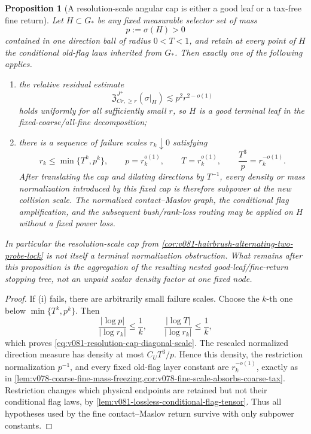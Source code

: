 \documentclass[10pt]{article}
\newtheorem{proposition}[theorem]{Proposition}
\begin{document}
\begin{proposition}[A resolution-scale angular cap is either a good leaf or a tax-free fine return]
\label{prop:v081-resolution-cap-freeze-or-return}
Let \(H\subset G_*\) be any fixed measurable selector set of mass
\[
p:=\sigma(H)>0
\]
contained in one direction ball of radius \(0<T<1\), and retain at every point of \(H\) the
conditional old-flag laws inherited from \(G_*\).  Then exactly one of the following applies.
\begin{enumerate}[label=\textnormal{(\roman*)}]
\item the relative residual estimate
\[
\mathfrak Z_{Cr,\ge r}^{J^+}(\sigma|_H)
\lesssim
p^2r^{2-o(1)}
\]
holds uniformly for all sufficiently small \(r\), so \(H\) is a good terminal leaf in the
fixed-coarse/all-fine decomposition;
\item there is a sequence of failure scales \(r_k\downarrow0\) satisfying
\begin{equation}
\label{eq:v081-resolution-cap-diagonal-scale}
\boxed{
r_k\le\min\{T^k,p^k\},
\qquad
p=r_k^{o(1)},
\qquad
T=r_k^{o(1)},
\qquad
\frac{T^3}{p}=r_k^{-o(1)}.
}
\end{equation}
After translating the cap and dilating directions by \(T^{-1}\), every density or mass
normalization introduced by this fixed cap is therefore subpower at the new collision scale.
The normalized contact--Maslov graph, the conditional flag amplification, and the subsequent
bush/rank-loss routing may be applied on \(H\) without a fixed power loss.
\end{enumerate}
In particular the resolution-scale cap from
\cref{cor:v081-hairbrush-alternating-two-probe-lock} is not itself a terminal normalization
obstruction.  What remains after this proposition is the aggregation of the resulting nested
good-leaf/fine-return stopping tree, not an unpaid scalar density factor at one fixed node.
\end{proposition}

\begin{proof}
If \textnormal{(i)} fails, there are arbitrarily small failure scales.  Choose the \(k\)-th one
below \(\min\{T^k,p^k\}\).  Then
\[
\frac{|\log p|}{|\log r_k|}
\le\frac1k,
\qquad
\frac{|\log T|}{|\log r_k|}
\le\frac1k,
\]
which proves \eqref{eq:v081-resolution-cap-diagonal-scale}.  The rescaled normalized direction
measure has density at most \(C_UT^3/p\).  Hence this density, the restriction normalization
\(p^{-1}\), and every fixed old-flag layer constant are \(r_k^{-o(1)}\), exactly as in
\cref{lem:v078-coarse-fine-mass-freezing,cor:v078-fine-scale-absorbs-coarse-tax}.
Restriction changes which physical endpoints are retained but not their conditional flag laws, by
\cref{lem:v081-lossless-conditional-flag-tensor}.  Thus all hypotheses used by the fine
contact--Maslov return survive with only subpower constants.
\end{proof}
\end{document}
